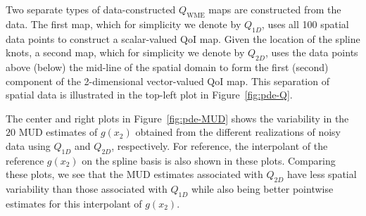 Two separate types of data-constructed $Q_\text{WME}$ maps are constructed from the data.
The first map, which for simplicity we denote by $Q_{1D}$, uses all 100 spatial data points to construct a scalar-valued QoI map.
Given the location of the spline knots, a second map, which for simplicity we denote by $Q_{2D}$, uses the data points above (below) the mid-line of the spatial domain to form the first (second) component of the 2-dimensional vector-valued QoI map.
This separation of spatial data is illustrated in the top-left plot in Figure~\ref{fig:pde-Q}.


The center and right plots in Figure~\ref{fig:pde-MUD} shows the variability in the $20$ MUD estimates of $g(x_2)$ obtained from the different realizations of noisy data using $Q_{1D}$ and $Q_{2D}$, respectively.
For reference, the interpolant of the reference $g(x_2)$ on the spline basis is also shown in these plots.
Comparing these plots, we see that the MUD estimates associated with $Q_{2D}$ have less spatial variability than those associated with $Q_{1D}$ while also being better pointwise estimates for this interpolant of $g(x_2)$.
